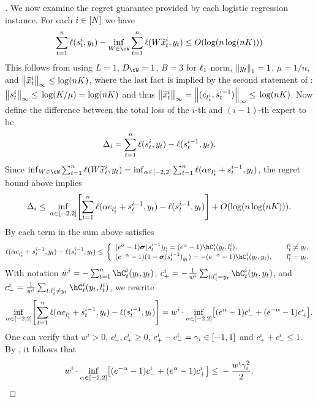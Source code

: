 \begin{proof}[]
We now examine the regret guarantee provided by each logistic regression instance. For each $i\in\brk{N}$ we have
\begin{equation*}
\sum_{t=1}^{n}\ls(s_{t}^{i},y_t) - \inf_{W\in\cW}\sum_{t=1}^{n}\ls(W\wt{x}^{i}_t,y_t) \leq{} O\prn*{\log\prn*{n\log(nK)}}
\end{equation*}
This follows from  using $L = 1$, $D_\cW = 1$, $B=3$ for $\ls_{1}$ norm, $\nrm*{y_t}_{1}=1$, $\mu=1/n$, and $\nrm*{\wt{x}_{t}^{i}}_{\infty} \leq \log(nK)$,
where the last fact is implied by the second statement of : $\nrm*{s_{t}^{i}}_{\infty}\leq{}\log(K/\mu) = \log(nK)$ and thus $\nrm*{\wt{x}_{t}^{i}}_{\infty} = \nrm*{(e_{l_{t}^{i}}, s_{t}^{i-1})}_{\infty} \leq{} \log(nK)$. 
Now define the difference between the total loss of the $i$-th and $(i-1)$-th expert to be
\[
\Delta_{i} = \sum_{t=1}^{n}\ls(s_{t}^{i}, y_t) - \ls(s_{t}^{i-1}, y_t).
\]
Since $\inf_{W\in\cW}\sum_{t=1}^{n}\ls(W\wt{x}^{i}_t,y_t) = \inf_{\alpha\in\brk*{-2,2}}\sum_{t=1}^{n}\ls(\alpha{}e_{l_{t}^{i}} + s_{t}^{i-1},y_t)$, the regret bound above implies
\[
\Delta_{i} \leq{} \inf_{\alpha\in\brk*{-2,2}}\brk*{\sum_{t=1}^{n}\ls(\alpha{}e_{l_{t}^{i}} + s_{t}^{i-1},y_t) - \ls(s_{t}^{i-1}, y_t)} + O\prn*{\log\prn*{n\log(nK)}}.
\]
By  each term in the sum above satisfies
\[
\ls(\alpha{}e_{l_{t}^{i}} + s_{t}^{i-1},y_t) - \ls(s_{t}^{i-1}, y_t)
\leq{} \left\{
\begin{array}{ll}
(e^{\alpha}-1)\mb{\sigma}(s_{t}^{i-1})_{l_{t}^{i}} = (e^{\alpha}-1)\hC_{t}^{i}(y_t, l_{t}^{i}),\quad &l_{t}^{i} \neq{}y_t,\\
(e^{-\alpha}-1)(1-\mb{\sigma}(s_{t}^{i-1})_{y_t}) = -(e^{-\alpha}-1)\hC_{t}^{i}(y_t, y_t),\quad{} &l_{t}^{i} =y_t.
\end{array}
\right.
\]
With notation $w^{i}=-\sum_{t=1}^{n}\hC_{t}^{i}(y_t, y_t)$, $c_{+}^{i}=-\frac{1}{w^i}\sum_{t:l_{t}^{i}=y_t}\hC_{t}^{i}(y_t, y_t)$, and $c_{-}^{i}=\frac{1}{w^i}\sum_{t:l_{t}^{i}\neq{}y_t}\hC_{t}^{i}(y_t, l_t^{i})$, we rewrite 
\[
\inf_{\alpha\in\brk*{-2,2}}\brk*{\sum_{t=1}^{n}\ls(\alpha{}e_{l_{t}^{i}} + s_{t}^{i-1},y_t) - \ls(s_{t}^{i-1}, y_t)} 
= w^{i}\cdot\inf_{\alpha\in\brk*{-2,2}}\brk*{(e^{\alpha}-1)c_{-}^{i} + (e^{-\alpha}-1)c_{+}^{i}}.
\]
One can verify that $w^{i}>0$,  $c_{-}^{i}, c_{+}^{i}\geq{}0$, $c_{+}^{i}-c_{-}^{i}=\gamma_{i}\in\brk*{-1,1}$ and $c_{+}^{i} + c_{-}^{i}\leq{}1$. 
By , it follows that
\[
w^{i}\cdot\inf_{\alpha\in\brk*{-2,2}}\brk*{(e^{-\alpha}-1)c_{-}^{i} + (e^{\alpha}-1)c_{+}^{i}}
\leq{} -\frac{w^{i}\gamma_{i}^{2}}{2}.
\]


\end{proof}
